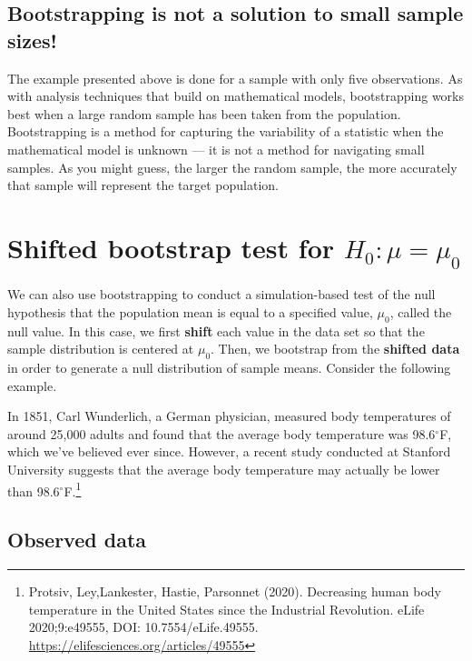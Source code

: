 \documentclass[
  10pt,
  openany]{book}
\theoremstyle{definition}
\theoremstyle{definition}
\theoremstyle{definition}
\theoremstyle{definition}
\theoremstyle{remark}
\begin{document}
\subsection{Bootstrapping is not a solution to small sample sizes!}\label{bootstrapping-is-not-a-solution-to-small-sample-sizes}

The example presented above is done for a sample with only five observations.
As with analysis techniques that build on mathematical models, bootstrapping works best when a large random sample has been taken from the population.
Bootstrapping is a method for capturing the variability of a statistic when the mathematical model is unknown --- it is not a method for navigating small samples.
As you might guess, the larger the random sample, the more accurately that sample will represent the target population.

\section{\texorpdfstring{Shifted bootstrap test for \(H_0: \mu = \mu_0\)}{Shifted bootstrap test for H\_0: \textbackslash mu = \textbackslash mu\_0}}\label{one-mean-null-boot}

We can also use bootstrapping to conduct a simulation-based test of the null hypothesis that the population mean is equal to a specified value, \(\mu_0\), called the null value. In this case, we first \textbf{shift} each value in the data set so that the sample distribution is centered at \(\mu_0\). Then, we bootstrap from the \textbf{shifted data} in order to generate a null distribution of sample means. Consider the following example.

In 1851, Carl Wunderlich, a German physician, measured body temperatures of around 25,000 adults and found that the average body temperature was 98.6\(^{\circ}\)F, which we've believed ever since. However, a recent study conducted at Stanford University suggests that the average body temperature may actually be lower than 98.6\(^{\circ}\)F.\footnote{Protsiv, Ley,Lankester, Hastie, Parsonnet (2020). Decreasing human body temperature in the United States since the Industrial Revolution. eLife 2020;9:e49555, DOI: 10.7554/eLife.49555. \url{https://elifesciences.org/articles/49555}}

\subsection{Observed data}\label{observed-data-5}
\end{document}
